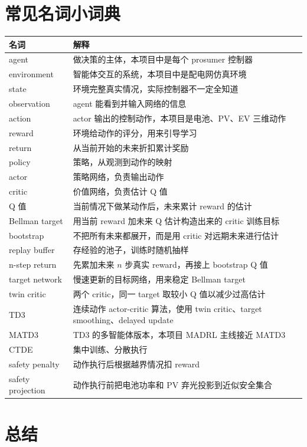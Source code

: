 \documentclass[UTF8,zihao=-4]{ctexart}
\begin{document}
\section{常见名词小词典}

\begin{longtable}{p{3.0cm}p{11.0cm}}
\toprule
名词 & 解释 \\
\midrule
\endhead
agent & 做决策的主体，本项目中是每个 prosumer 控制器 \\
environment & 智能体交互的系统，本项目中是配电网仿真环境 \\
state & 环境完整真实情况，实际控制器不一定全知道 \\
observation & agent 能看到并输入网络的信息 \\
action & actor 输出的控制动作，本项目是电池、PV、EV 三维动作 \\
reward & 环境给动作的评分，用来引导学习 \\
return & 从当前开始的未来折扣累计奖励 \\
policy & 策略，从观测到动作的映射 \\
actor & 策略网络，负责输出动作 \\
critic & 价值网络，负责估计 Q 值 \\
Q 值 & 当前情况下做某动作后，未来累计 reward 的估计 \\
Bellman target & 用当前 reward 加未来 Q 估计构造出来的 critic 训练目标 \\
bootstrap & 不把所有未来都展开，而是用 critic 对远期未来进行估计 \\
replay buffer & 存经验的池子，训练时随机抽样 \\
n-step return & 先累加未来 $n$ 步真实 reward，再接上 bootstrap Q 值 \\
target network & 慢速更新的目标网络，用来稳定 Bellman target \\
twin critic & 两个 critic，同一 target 取较小 Q 值以减少过高估计 \\
TD3 & 连续动作 actor-critic 算法，使用 twin critic、target smoothing、delayed update \\
MATD3 & TD3 的多智能体版本，本项目 MADRL 主线接近 MATD3 \\
CTDE & 集中训练、分散执行 \\
safety penalty & 动作执行后根据越界情况扣 reward \\
safety projection & 动作执行前把电池功率和 PV 弃光投影到近似安全集合 \\
\bottomrule
\end{longtable}

\section{总结}
\end{document}
